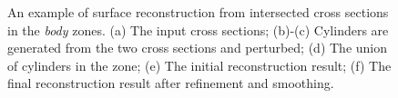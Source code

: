 \begin{figure} [htbp]
{\begin{minipage}[b]{0.22\textwidth}
    \end{minipage}}
  \caption{An example of surface reconstruction from intersected cross sections in the \textit{body} zones. (a) The input cross sections; (b)-(c) Cylinders are generated from the two cross sections and perturbed; (d) The union of cylinders in the zone; (e) The initial reconstruction result; (f) The final reconstruction result after refinement and smoothing.}
  \label{fig:csinters} %
\end{figure}

